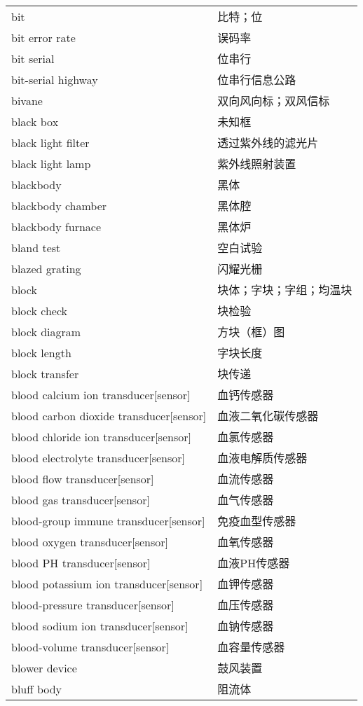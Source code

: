 \documentclass[
]{article}
\begin{document}
\begin{longtable}[]{@{}ll@{}}
bit & 比特；位 \\
bit error rate & 误码率 \\
bit serial & 位串行 \\
bit-serial highway & 位串行信息公路 \\
bivane & 双向风向标；双风信标 \\
black box & 未知框 \\
black light filter & 透过紫外线的滤光片 \\
black light lamp & 紫外线照射装置 \\
blackbody & 黑体 \\
blackbody chamber & 黑体腔 \\
blackbody furnace & 黑体炉 \\
bland test & 空白试验 \\
blazed grating & 闪耀光栅 \\
block & 块体；字块；字组；均温块 \\
block check & 块检验 \\
block diagram & 方块（框）图 \\
block length & 字块长度 \\
block transfer & 块传递 \\
blood calcium ion transducer{[}sensor{]} & 血钙传感器 \\
blood carbon dioxide transducer{[}sensor{]} & 血液二氧化碳传感器 \\
blood chloride ion transducer{[}sensor{]} & 血氯传感器 \\
blood electrolyte transducer{[}sensor{]} & 血液电解质传感器 \\
blood flow transducer{[}sensor{]} & 血流传感器 \\
blood gas transducer{[}sensor{]} & 血气传感器 \\
blood-group immune transducer{[}sensor{]} & 免疫血型传感器 \\
blood oxygen transducer{[}sensor{]} & 血氧传感器 \\
blood PH transducer{[}sensor{]} & 血液PH传感器 \\
blood potassium ion transducer{[}sensor{]} & 血钾传感器 \\
blood-pressure transducer{[}sensor{]} & 血压传感器 \\
blood sodium ion transducer{[}sensor{]} & 血钠传感器 \\
blood-volume transducer{[}sensor{]} & 血容量传感器 \\
blower device & 鼓风装置 \\
bluff body & 阻流体 \\

\end{longtable}
\end{document}
